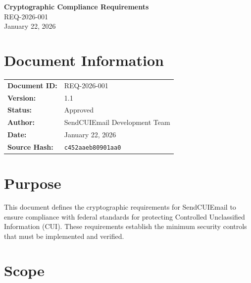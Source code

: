 \documentclass[11pt,letterpaper]{article}
\newcommand{\UniqueID}{REQ-2026-001}
\newcommand{\DocumentDate}{January 22, 2026}
\newcommand{\AuthorName}{SendCUIEmail Development Team}
\newcommand{\DocumentTitle}{Cryptographic Compliance Requirements}
\begin{document}
\begin{center}
\Large\textbf{\DocumentTitle}\\[6pt]
\large\UniqueID\\[12pt]
\normalsize\DocumentDate
\end{center}

\vspace{0.25in}

\section*{Document Information}

\begin{tabular}{@{}ll@{}}
\textbf{Document ID:} & \UniqueID \\
\textbf{Version:} & 1.1 \\
\textbf{Status:} & Approved \\
\textbf{Author:} & \AuthorName \\
\textbf{Date:} & \DocumentDate \\
\textbf{Source Hash:} & \texttt{c452aaeb80901aa0} \\
\end{tabular}

\vspace{0.25in}

\section{Purpose}

This document defines the cryptographic requirements for SendCUIEmail to ensure compliance with federal standards for protecting Controlled Unclassified Information (CUI). These requirements establish the minimum security controls that must be implemented and verified.

\section{Scope}
\end{document}
